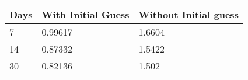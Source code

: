 \begin{tabular}{lll}
Days & With Initial Guess & Without Initial guess \\ 
\hline 
7 & 0.99617 & 1.6604 \\ 
14 & 0.87332 & 1.5422 \\ 
30 & 0.82136 & 1.502 \\ 
\hline 
\end{tabular}